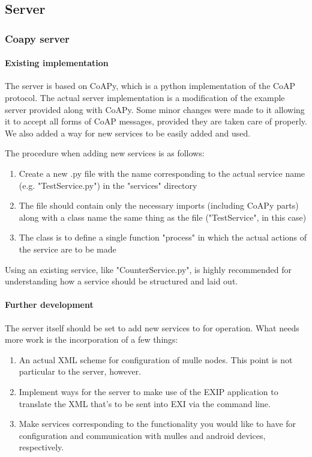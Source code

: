 \subsection{Server}
\subsubsection{Coapy server}
\paragraph{Existing implementation}
The server is based on CoAPy, which is a python implementation of the CoAP protocol. The actual server implementation is a modification of the example server provided along with CoAPy.
Some minor changes were made to it allowing it to accept all forms of CoAP messages, provided they are taken care of properly. We also added a way for new services to be easily added 
and used. 

The procedure when adding new services is as follows:
\begin{enumerate}
\item Create a new .py file with the name corresponding to the actual service name (e.g. "TestService.py") in the "services" directory
\item The file should contain only the necessary imports (including CoAPy parts) along with a class name the same thing as the file ("TestService", in this case)
\item The class is to define a single function "process" in which the actual actions of the service are to be made
\end{enumerate}

Using an existing service, like "CounterService.py", is highly recommended for understanding how a service should be structured and laid out.

\paragraph{Further development}
The server itself should be set to add new services to for operation. What needs more work is the incorporation of a few things:

\begin{enumerate}
\item An actual XML scheme for configuration of mulle nodes. This point is not particular to the server, however.
\item Implement ways for the server to make use of the EXIP application to translate the XML that's to be sent into EXI via the command line.
\item Make services corresponding to the functionality you would like to have for configuration and communication with mulles and android devices, respectively.
\end{enumerate}
